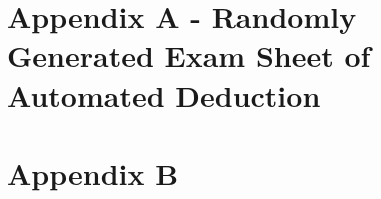 \documentclass[12pt]{llncs}
\begin{document}







\newpage
\appendix

\section{Appendix A - Randomly Generated Exam Sheet of Automated Deduction}\label{appendixA}
\BgThispage
\newpage
\clearpage

\section{Appendix B}\label{appendixB}

\end{document}
